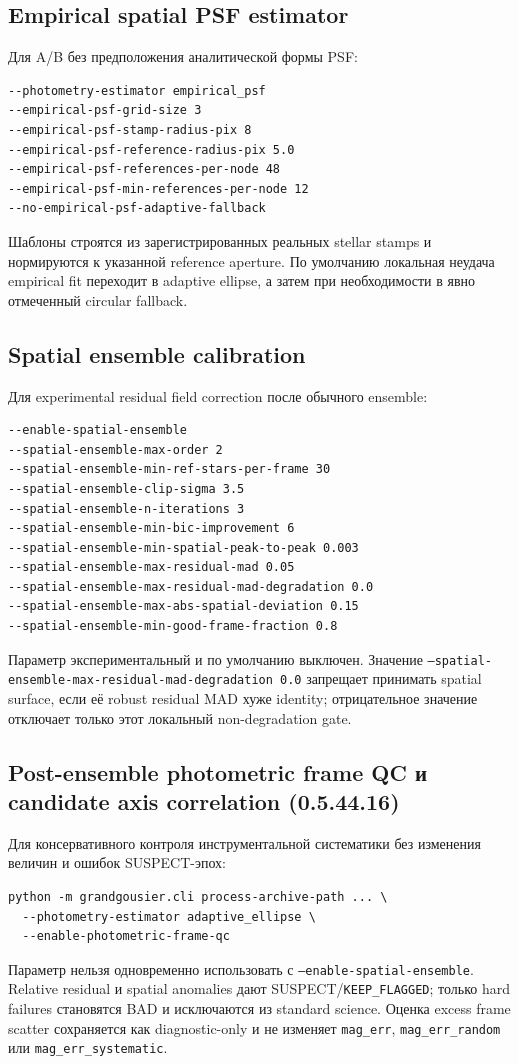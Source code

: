 \subsection{Empirical spatial PSF estimator}
Для A/B без предположения аналитической формы PSF:
\begin{lstlisting}
--photometry-estimator empirical_psf
--empirical-psf-grid-size 3
--empirical-psf-stamp-radius-pix 8
--empirical-psf-reference-radius-pix 5.0
--empirical-psf-references-per-node 48
--empirical-psf-min-references-per-node 12
--no-empirical-psf-adaptive-fallback
\end{lstlisting}
Шаблоны строятся из зарегистрированных реальных stellar stamps и нормируются к указанной
reference aperture. По умолчанию локальная неудача empirical fit переходит в adaptive ellipse,
а затем при необходимости в явно отмеченный circular fallback.


\subsection{Spatial ensemble calibration}
Для experimental residual field correction после обычного ensemble:
\begin{lstlisting}
--enable-spatial-ensemble
--spatial-ensemble-max-order 2
--spatial-ensemble-min-ref-stars-per-frame 30
--spatial-ensemble-clip-sigma 3.5
--spatial-ensemble-n-iterations 3
--spatial-ensemble-min-bic-improvement 6
--spatial-ensemble-min-spatial-peak-to-peak 0.003
--spatial-ensemble-max-residual-mad 0.05
--spatial-ensemble-max-residual-mad-degradation 0.0
--spatial-ensemble-max-abs-spatial-deviation 0.15
--spatial-ensemble-min-good-frame-fraction 0.8
\end{lstlisting}
Параметр экспериментальный и по умолчанию выключен. Значение
\texttt{--spatial-ensemble-max-residual-mad-degradation 0.0} запрещает принимать spatial surface,
если её robust residual MAD хуже identity; отрицательное значение отключает только этот локальный
non-degradation gate.

\subsection*{Post-ensemble photometric frame QC и candidate axis correlation (0.5.44.16)}

Для консервативного контроля инструментальной систематики без изменения величин и ошибок SUSPECT-эпох:
\begin{lstlisting}
python -m grandgousier.cli process-archive-path ... \
  --photometry-estimator adaptive_ellipse \
  --enable-photometric-frame-qc
\end{lstlisting}
Параметр нельзя одновременно использовать с \texttt{--enable-spatial-ensemble}. Relative residual и
spatial anomalies дают SUSPECT/\texttt{KEEP\_FLAGGED}; только hard failures становятся BAD и
исключаются из standard science. Оценка excess frame scatter сохраняется как diagnostic-only и не
изменяет \texttt{mag\_err}, \texttt{mag\_err\_random} или \texttt{mag\_err\_systematic}.

